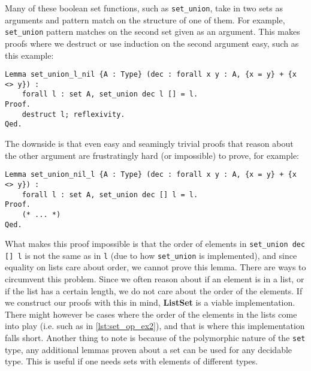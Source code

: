 Many of these boolean set functions, such as \lstinline{set_union},
take in two sets as arguments and pattern match on the structure of one of them.
For example, \lstinline{set_union} pattern matches on the second set given as an argument.
This makes proofs where we destruct or use induction on the second argument easy, such as this example:

\begin{minipage}{\linewidth}
\begin{lstlisting}[language=Coq, label={lst:set_op_ex1}, caption={Easy proof of lemma in \lstinline{ListSet} module}]
Lemma set_union_l_nil {A : Type} (dec : forall x y : A, {x = y} + {x <> y}) :
    forall l : set A, set_union dec l [] = l.
Proof.
    destruct l; reflexivity.
Qed.
\end{lstlisting}
\end{minipage}

The downside is that even easy and seamingly trivial proofs that reason about the other argument are frustratingly hard
(or impossible) to prove, for example:

\begin{minipage}{\linewidth}
\begin{lstlisting}[language=Coq, label={lst:set_op_ex2}, caption={Impossible proof of lemma in \lstinline{ListSet} module}]
Lemma set_union_nil_l {A : Type} (dec : forall x y : A, {x = y} + {x <> y}) :
    forall l : set A, set_union dec [] l = l.
Proof.
    (* ... *)
Qed.
\end{lstlisting}
\end{minipage}

What makes this proof impossible is that the order of elements in \lstinline{set_union dec [] l} is not the
same as in \lstinline{l} (due to how \lstinline{set_union} is implemented), and since equality on lists care about order,
we cannot prove this lemma.
There are ways to circumvent this problem.
Since we often reason about if an element is in a list, or if the list has a certain length,
we do not care about the order of the elements.
If we construct our proofs with this in mind, \textbf{ListSet} is a viable implementation.
There might however be cases where the order of the elements in the lists come into play (i.e. such as in \autoref{lst:set_op_ex2}),
and that is where this implementation falls short.
Another thing to note is because of the polymorphic nature of the \lstinline{set} type, any additional lemmas proven about a set can be
used for any decidable type. This is useful if one needs sets with elements of different types.

